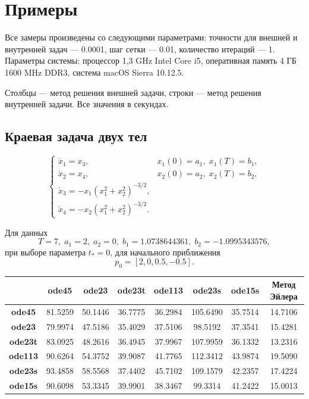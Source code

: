 \documentclass[oneside,final,12pt]{extreport}
\begin{document}
\chapter*{Примеры}

Все замеры произведены со следующими параметрами: точности для внешней и внутренней задач --- 0.0001, шаг сетки --- 0.01, количество итераций --- 1. Параметры системы: процессор 1,3 GHz Intel Core i5, оперативная память 4 ГБ 1600 MHz DDR3, система macOS Sierra 10.12.5. 

Столбцы --- метод решения внешней задачи, строки --- метод решения внутренней задачи. Все значения в секундах.

\section*{Краевая задача двух тел}

$$
\begin{cases}
	\dot{x}_1=x_3, &x_1(0)=a_1, \;x_1(T)=b_1,
	\\
	\dot{x}_2=x_4, &x_2(0)=a_2, \;x_2(T)=b_2,
	\\
	\dot{x}_3=-x_1(x_1^2+x_2^2)^{-3/2}, 
	\\
	\dot{x}_4=-x_2(x_1^2+x_2^2)^{-3/2}.
\end{cases}	
$$

\noindent Для данных
$$
T = 7, \; a_1 = 2, \;a_2 = 0, \;b_1 = 1.0738644361, \;b_2 = -1.0995343576,
$$ 
при выборе параметра $t_* = 0$, для начального приближения 
$$
p_0 = [2, 0, 0.5, -0.5].
$$

\begin{table}[H]
	\begin{center}
		\begin{tabular}{|c|c|c|c|c|c|c|c|}
			\hline
			& \textbf{ode45} & \textbf{ode23} & \textbf{ode23t} & \textbf{ode113} & \textbf{ode23s} & \textbf{ode15s} & \textbf{Метод Эйлера} \\
			\hline
			\textbf{ode45} & 81.5259 & 50.1446 & 36.7775 & 36.2984 & 105.6490 & 35.7514 & 14.7106\\
			\hline
			\textbf{ode23} & 79.9974 & 47.5186 & 35.4029 & 37.5106 & 98.5192 & 37.3541 & 15.4281\\
			\hline
			\textbf{ode23t} & 83.0925 & 48.2616 & 36.4945 & 37.9967 & 107.9959 &36.1332 & 13.2316\\
			\hline
			\textbf{ode113} & 90.6264 & 54.3752 & 39.9087 & 41.7765 & 112.3412 & 43.9874 & 19.5090\\
			\hline
			\textbf{ode23s} & 93.4858 & 58.5568 & 37.4402 & 45.7102 & 109.1579 & 42.2357 & 17.4224\\
			\hline
			\textbf{ode15s} & 90.6098 & 53.3345 & 39.9901 & 38.3467 & 99.3314 & 41.2422 & 15.0013\\
			\hline
		\end{tabular}
	\end{center}
\end{table}
\end{document}
